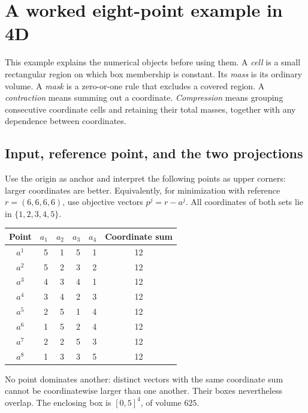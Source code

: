 \section{A worked eight-point example in 4D}
\label{app:eight}

This example explains the numerical objects before using them. A
\emph{cell} is a small rectangular region on which box membership is
constant. Its \emph{mass} is its ordinary volume. A \emph{mask} is a
zero-or-one rule that excludes a covered region. A \emph{contraction}
means summing out a coordinate. \emph{Compression} means grouping
consecutive coordinate cells and retaining their total masses, together
with any dependence between coordinates.

\subsection{Input, reference point, and the two projections}
Use the origin as anchor and interpret the following points as upper
corners: larger coordinates are better. Equivalently, for minimization
with reference $r=(6,6,6,6)$, use objective vectors $p^j=r-a^j$.
All coordinates of both sets lie in $\{1,2,3,4,5\}$.
\begin{center}
\begin{tabular}{@{}c@{\qquad}rrrr@{\qquad}c@{}}
\toprule
Point & $a_1$ & $a_2$ & $a_3$ & $a_4$ & Coordinate sum\\\midrule
$a^1$ &5&1&5&1&12\\
$a^2$ &5&2&3&2&12\\
$a^3$ &4&3&4&1&12\\
$a^4$ &3&4&2&3&12\\
$a^5$ &2&5&1&4&12\\
$a^6$ &1&5&2&4&12\\
$a^7$ &2&2&5&3&12\\
$a^8$ &1&3&3&5&12\\\bottomrule
\end{tabular}
\end{center}
No point dominates another: distinct vectors with the same coordinate
sum cannot be coordinatewise larger than one another. Their boxes
nevertheless overlap. The enclosing box is $[0,5]^4$, of volume $625$.

